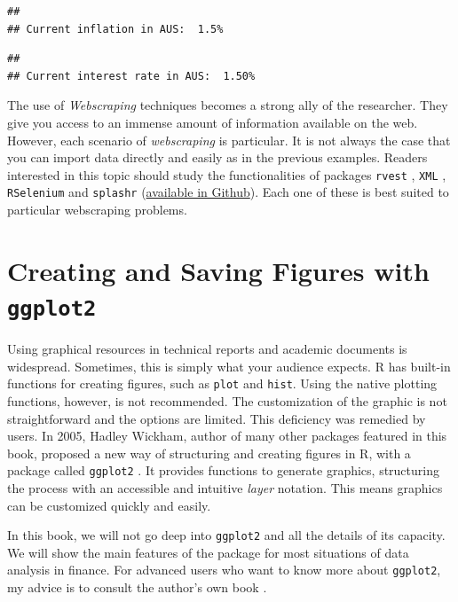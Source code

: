 \documentclass[11pt,]{book}
\begin{document}
\begin{verbatim}
## 
## Current inflation in AUS:  1.5%
\end{verbatim}

\begin{verbatim}
## 
## Current interest rate in AUS:  1.50%
\end{verbatim}

The use of \emph{Webscraping} techniques becomes a strong ally of the
researcher. They give you access to an immense amount of information
available on the web. However, each scenario of \emph{webscraping} is
particular. It is not always the case that you can import data directly
and easily as in the previous examples. Readers interested in this topic
should study the functionalities of packages \texttt{rvest}
\citep{rvest}, \texttt{XML} \citep{XML}, \texttt{RSelenium}
\citep{RSelenium} and \texttt{splashr}
(\href{https://github.com/hrbrmstr/splashr}{available in Github}). Each
one of these is best suited to particular webscraping problems.
   

\hypertarget{Figures}{\chapter{\texorpdfstring{Creating and Saving
Figures with
\texttt{ggplot2}}{Creating and Saving Figures with ggplot2}}\label{Figures}}

Using graphical resources in technical reports and academic documents is
widespread. Sometimes, this is simply what your audience expects. R has
built-in functions for creating figures, such as \texttt{plot} and
\texttt{hist}. Using the native plotting functions, however, is not
recommended. The customization of the graphic is not straightforward and
the options are limited. This deficiency was remedied by users. In 2005,
Hadley Wickham, author of many other packages featured in this book,
proposed a new way of structuring and creating figures in R, with a
package called \texttt{ggplot2} \citep{wickham2009ggplot2}. It provides
functions to generate graphics, structuring the process with an
accessible and intuitive \emph{layer} notation. This means graphics can
be customized quickly and easily. 

In this book, we will not go deep into \texttt{ggplot2} and all the
details of its capacity. We will show the main features of the package
for most situations of data analysis in finance. For advanced users who
want to know more about \texttt{ggplot2}, my advice is to consult the
author's own book \citep{wickham2009ggplot2}.
\end{document}
